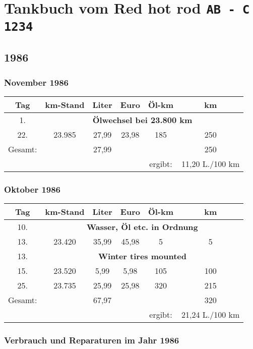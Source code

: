 \documentclass[11pt, a4paper]{article}
\begin{document}
\section*{Tankbuch vom Red hot rod\hspace*{4mm} \texttt{AB - C 1234}}

\subsection*{1986}

\subsubsection*{November \hspace*{1mm} 1986}

\begin{tabular}{|cccccc|}
\hline
Tag & km-Stand & Liter & Euro & Öl-km & km \\
\hline
1. & \multicolumn{5}{c|}{\textbf{Ölwechsel bei 23.800 km}} \\
22. & 23.985 & 27,99 & 23,98 & 185 & 250 \\
\hline
 Gesamt: & & 27,99 & & & 250 \\
 & & & & ergibt: & 11,20 L./100 km \\
\hline
\end{tabular}

\subsubsection*{Oktober \hspace*{1mm} 1986}

\begin{tabular}{|cccccc|}
\hline
Tag & km-Stand & Liter & Euro & Öl-km & km \\
\hline
10. & \multicolumn{5}{c|}{\textbf{Wasser, Öl etc. in Ordnung}} \\
13. & 23.420 & 35,99 & 45,98 & 5 & 5 \\
13. & \multicolumn{5}{c|}{\textbf{Winter tires mounted}} \\
15. & 23.520 & 5,99 & 5,98 & 105 & 100 \\
25. & 23.735 & 25,99 & 25,98 & 320 & 215 \\
\hline
 Gesamt: & & 67,97 & & & 320 \\
 & & & & ergibt: & 21,24 L./100 km \\
\hline
\end{tabular}

\subsubsection*{Verbrauch und Reparaturen im Jahr 1986}
\end{document}
